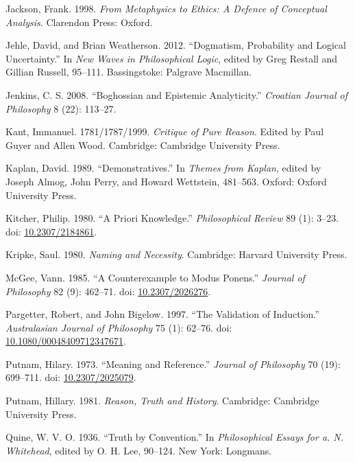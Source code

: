 \documentclass[
  10pt,
  letterpaper,
  DIV=11,
  numbers=noendperiod,
  twoside]{scrartcl}
\newlength{\cslhangindent}
\newenvironment{CSLReferences}[2] %
 {\begin{list}{}{%
  \setlength{\itemindent}{0pt}
  \setlength{\leftmargin}{0pt}
  \setlength{\parsep}{0pt}
  \ifodd #1
   \setlength{\leftmargin}{\cslhangindent}
   \setlength{\itemindent}{-1\cslhangindent}
  \fi
  \setlength{\itemsep}{#2\baselineskip}}}
 {\end{list}}
\begin{document}
\begin{CSLReferences}{1}{0}
Jackson, Frank. 1998. \emph{From Metaphysics to Ethics: A Defence of
Conceptual Analysis}. Clarendon Press: Oxford.

Jehle, David, and Brian Weatherson. 2012. {``Dogmatism, Probability and
Logical Uncertainty.''} In \emph{New Waves in Philosophical Logic},
edited by Greg Restall and Gillian Russell, 95--111. Bassingstoke:
Palgrave Macmillan.

Jenkins, C. S. 2008. {``Boghossian and Epistemic Analyticity.''}
\emph{Croatian Journal of Philosophy} 8 (22): 113--27.

Kant, Immanuel. 1781/1787/1999. \emph{Critique of Pure Reason}. Edited
by Paul Guyer and Allen Wood. Cambridge: Cambridge University Press.

Kaplan, David. 1989. {``Demonstratives.''} In \emph{Themes from Kaplan},
edited by Joseph Almog, John Perry, and Howard Wettstein, 481--563.
Oxford: Oxford University Press.

Kitcher, Philip. 1980. {``A Priori Knowledge.''} \emph{Philosophical
Review} 89 (1): 3--23. doi:
\href{https://doi.org/10.2307/2184861}{10.2307/2184861}.

Kripke, Saul. 1980. \emph{Naming and Necessity}. Cambridge: Harvard
University Press.

McGee, Vann. 1985. {``A Counterexample to Modus Ponens.''} \emph{Journal
of Philosophy} 82 (9): 462--71. doi:
\href{https://doi.org/10.2307/2026276}{10.2307/2026276}.

Pargetter, Robert, and John Bigelow. 1997. {``The Validation of
Induction.''} \emph{Australasian Journal of Philosophy} 75 (1): 62--76.
doi:
\href{https://doi.org/10.1080/00048409712347671}{10.1080/00048409712347671}.

Putnam, Hilary. 1973. {``Meaning and Reference.''} \emph{Journal of
Philosophy} 70 (19): 699--711. doi:
\href{https://doi.org/10.2307/2025079}{10.2307/2025079}.

Putnam, Hillary. 1981. \emph{Reason, Truth and History}. Cambridge:
Cambridge University Press.

Quine, W. V. O. 1936. {``Truth by Convention.''} In \emph{Philosophical
Essays for a. N. Whitehead}, edited by O. H. Lee, 90--124. New York:
Longmans.


\end{CSLReferences}
\end{document}
